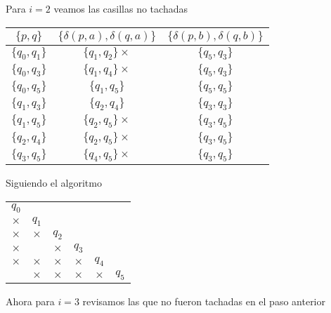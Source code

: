     Para $i=2$ veamos las casillas no tachadas
    \begin{center}
                \begin{tabular}{c||c|c}
                  $\{p,q\}$ & $\{\delta(p,a),\delta(q,a)\}$ & $\{\delta(p,b),\delta(q,b)\}$\\ \hline
                  $\{q_0,q_1\}$ & $\{q_1,q_2\}\times$ & $\{q_5,q_3\}$ \\ \hline
                  $\{q_0,q_3\}$ & $\{q_1,q_4\}\times$ & $\{q_5,q_3\}$ \\ \hline
                  $\{q_0,q_5\}$ & $\{q_1,q_5\}$ & $\{q_5,q_5\}$ \\ \hline
                  $\{q_1,q_3\}$ & $\{q_2,q_4\}$ & $\{q_3,q_3\}$ \\ \hline
                  $\{q_1,q_5\}$ & $\{q_2,q_5\}\times$ & $\{q_3,q_5\}$ \\ \hline
                  $\{q_2,q_4\}$ & $\{q_2,q_5\}\times$ & $\{q_3,q_5\}$ \\ \hline
                  $\{q_3,q_5\}$ & $\{q_4,q_5\}\times$ & $\{q_3,q_5\}$ \\ \hline
                \end{tabular}
            \end{center}
    Siguiendo el algoritmo
        \begin{center}
            \begin{tabular}{cccccc}
                $q_0$ \\ \cline{1-1}
                \multicolumn{1}{|c|}{$\times$} & $q_1$ \\ \cline{1-2}
                \multicolumn{1}{|c|}{$\times$} & \multicolumn{1}{|c|}{$\times$} & $q_2$ \\ \cline{1-3}
                \multicolumn{1}{|c|}{$\times$} & \multicolumn{1}{|c|}{}  & \multicolumn{1}{|c|}{$\times$} & $q_3$ \\ \cline{1-4} 
                \multicolumn{1}{|c|}{$\times$} & \multicolumn{1}{|c|}{$\times$} & \multicolumn{1}{|c|}{$\times$} & \multicolumn{1}{|c|}{$\times$} & $q_4$ \\ \cline{1-5}
                \multicolumn{1}{|c|}{} & \multicolumn{1}{|c|}{$\times$} & \multicolumn{1}{|c|}{$\times$} & \multicolumn{1}{|c|}{$\times$}  & \multicolumn{1}{|c|}{$\times$} & $q_5$ \\ \cline{1-5}         
            \end{tabular}
        \end{center}

        Ahora para $i=3$ revisamos las que no fueron tachadas en el paso anterior

